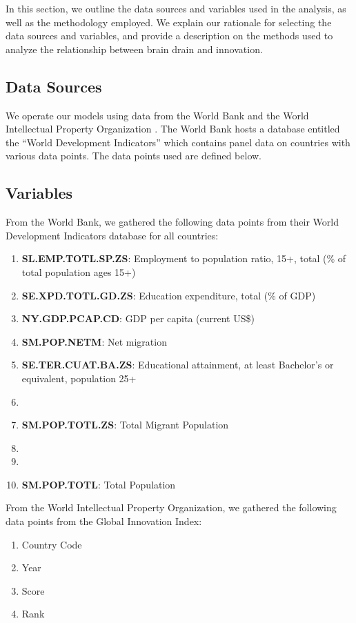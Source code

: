 \documentclass[12pt]{article}
\begin{document}
In this section, we outline the data sources and variables used in the analysis, as well as the methodology employed. We explain our rationale for selecting the data sources and variables, and provide a description on the methods used to analyze the relationship between brain drain and innovation.

\subsection{Data Sources} \label{data-sources}

We operate our models using data from the World Bank \nocite{worldbankwdi} and the World Intellectual Property Organization \nocite{gii2022}.
The World Bank hosts a database entitled the ``World Development Indicators'' which contains panel data on countries with various data points.
The data points used are defined below.

\subsection{Variables} \label{data-variables}
From the World Bank, we gathered the following data points from their World Development Indicators database for all countries:

\begin{enumerate}
    \item \textbf{SL.EMP.TOTL.SP.ZS}: Employment to population ratio, 15+, total (\% of total population ages 15+)
    \item \textbf{SE.XPD.TOTL.GD.ZS}: Education expenditure, total (\% of GDP)
    \item \textbf{NY.GDP.PCAP.CD}: GDP per capita (current US\$)
    \item \textbf{SM.POP.NETM}: Net migration
    \item \textbf{SE.TER.CUAT.BA.ZS}: Educational attainment, at least Bachelor's or equivalent, population 25+
    \item \item \textbf{SM.POP.TOTL.ZS}: Total Migrant Population
    \item \item \item \textbf{SM.POP.TOTL}: Total Population
\end{enumerate}

From the World Intellectual Property Organization, we gathered the following data points from the Global Innovation Index:
\begin{enumerate}
    \item Country Code
    \item Year
    \item Score
    \item Rank
\end{enumerate}
\end{document}
